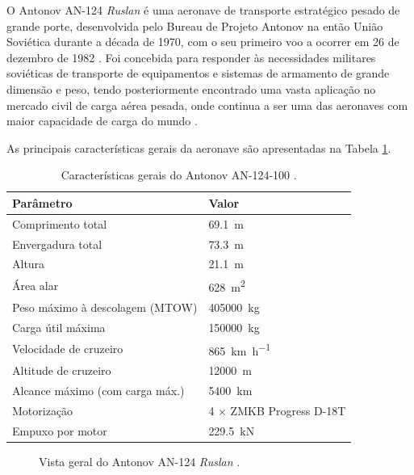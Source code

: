 \documentclass[a4paper,fleqn,noprintline]{cas-dc}
\begin{document}
O Antonov AN-124 \textit{Ruslan} é uma aeronave de transporte estratégico pesado de grande porte, desenvolvida pelo Bureau de Projeto Antonov na então União Soviética durante a década de 1970, com o seu primeiro voo a ocorrer em 26 de dezembro de 1982 \cite{Gordon2008}. Foi concebida para responder às necessidades militares soviéticas de transporte de equipamentos e sistemas de armamento de grande dimensão e peso, tendo posteriormente encontrado uma vasta aplicação no mercado civil de carga aérea pesada, onde continua a ser uma das aeronaves com maior capacidade de carga do mundo \cite{GarciaFernandez2025}.

As principais características gerais da aeronave são apresentadas na Tabela \ref{tab:an124_specs}.

\begin{table}[h!]
\centering
\caption{Características gerais do Antonov AN-124-100 
\cite{Gordon2008, GarciaFernandez2025}.}
\label{tab:an124_specs}
\renewcommand{\arraystretch}{1.4}
\begin{tabularx}{\textwidth}{p{5.5cm} X}
\toprule
\textbf{Parâmetro} & \textbf{Valor} \\
\midrule
Comprimento total & \SI{69.1}{\meter} \\
Envergadura total & \SI{73.3}{\meter} \\
Altura & \SI{21.1}{\meter} \\
Área alar & \SI{628}{\meter\squared} \\
Peso máximo à descolagem (MTOW) & \SI{405000}{\kilo\gram} \\
Carga útil máxima & \SI{150000}{\kilo\gram} \\
Velocidade de cruzeiro & \SI{865}{\kilo\meter\per\hour} \\
Altitude de cruzeiro & \SI{12000}{\meter} \\
Alcance máximo (com carga máx.) & \SI{5400}{\kilo\meter} \\
Motorização & 4 $\times$ ZMKB Progress D-18T \\
Empuxo por motor & \SI{229.5}{\kilo\newton} \\
\bottomrule
\end{tabularx}
\end{table}

\begin{figure}[h!]
    \centering
    \caption{Vista geral do Antonov AN-124 \textit{Ruslan} 
    \cite{Gordon2008}.}
    \label{fig:an124_geral}
\end{figure}
\end{document}
